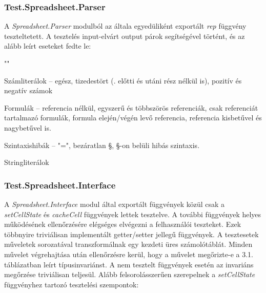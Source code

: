\subsubsection{Test.Spreadsheet.Parser}

A \textit{Spreadsheet.Parser} modulból az általa egyedüliként exportált \textit{rep} függvény teszteltetett. A tesztelés input-elvárt output párok segítségével történt, és az alább leírt eseteket fedte le:

\begin{compactenum}
	\item ""
	\item Számliterálok -- egész, tizedestört (. előtti és utáni rész nélkül is), pozitív és negatív számok
	\item Formulák -- referencia nélkül, egyszerű és többszörös referenciák, csak referenciát tartalmazó formulák, formula elején/végén levő referencia, referencia kisbetűvel és nagybetűvel is.
	\item Szintaxishibák -- "=", bezáratlan §, §-on belüli hibás szintaxis.
	\item Stringliterálok
\end{compactenum}

\subsubsection{Test.Spreadsheet.Interface}

A \textit{Spreadsheet.Interface} modul által exportált függvények közül
csak a \textit{setCellState} és \textit{cacheCell} függvények lettek tesztelve. A további függvények helyes működésének ellenőrzésére elégséges elvégezni a felhasználói teszteket. Ezek többnyire triviálisan implementált getter/setter jellegű függvények.
A tesztesetek műveletek sorozatával transzformálnak egy kezdeti üres számolótáblát. Minden művelet végrehajtása után ellenőrzésre kerül, hogy a művelet megőrizte-e a 3.1. táblázatban leírt típusinvariánst. A nem tesztelt függvények esetén az invariáns megőrzése triviálisan teljesül.
Alább felsorolásszerűen szerepelnek a \textit{setCellState} függvényhez tartozó tesztelési szempontok:

